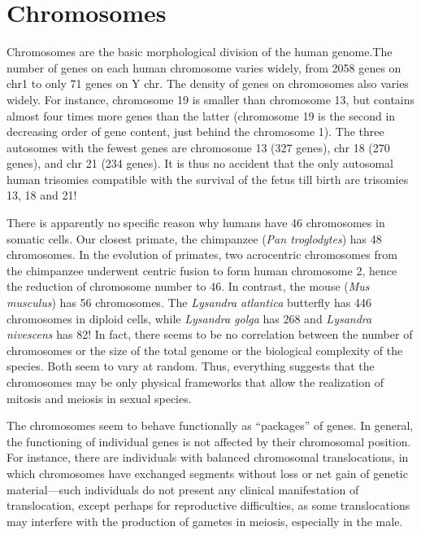 \section{Chromosomes}

Chromosomes are the basic morphological division of the human genome.The number of genes on each human chromosome varies widely, 
from 2058 genes on chr1 to only 71 genes on Y chr. The density of genes on chromosomes also varies widely. For instance, 
chromosome 19 is smaller than chromosome 13, but contains almost four times more genes than the latter 
(chromosome 19 is the second in decreasing order of gene content, just behind the chromosome 1). The three autosomes 
with the fewest genes are chromosome 13 (327 genes), chr 18 (270 genes), and chr 21 (234 genes). It is thus no accident 
that the only autosomal human trisomies compatible with the survival of the fetus till birth are trisomies 13, 18 and 21! 

There is apparently no specific reason why humans have 46 chromosomes in somatic cells. Our closest primate, the chimpanzee 
(\textit{Pan troglodytes}) has 48 chromosomes. In the evolution of primates, two acrocentric chromosomes from the chimpanzee underwent 
centric fusion to form human chromosome 2, hence the reduction of chromosome number to 46. In contrast, the mouse (\textit{Mus musculus}) 
has 56 chromosomes. The \textit{Lysandra atlantica} butterfly has 446 chromosomes in diploid cells, while \textit{Lysandra golga} has 268 and 
\textit{Lysandra nivescens} has 82! In fact, there seems to be no correlation between the number of chromosomes or the size of the 
total genome or the biological complexity of the species. Both seem to vary at random. Thus, everything suggests that the 
chromosomes may be only physical frameworks that allow the realization of mitosis and meiosis in sexual species. 

The chromosomes seem to behave functionally as “packages” of genes. In general, the functioning of individual genes is not 
affected by their chromosomal position. For instance, there are individuals with balanced chromosomal translocations, in 
which chromosomes have exchanged segments without loss or net gain of genetic material—such individuals do not present any 
clinical manifestation of translocation, except perhaps for reproductive difficulties, as some translocations may interfere 
with the production of gametes in meiosis, especially in the male. 

